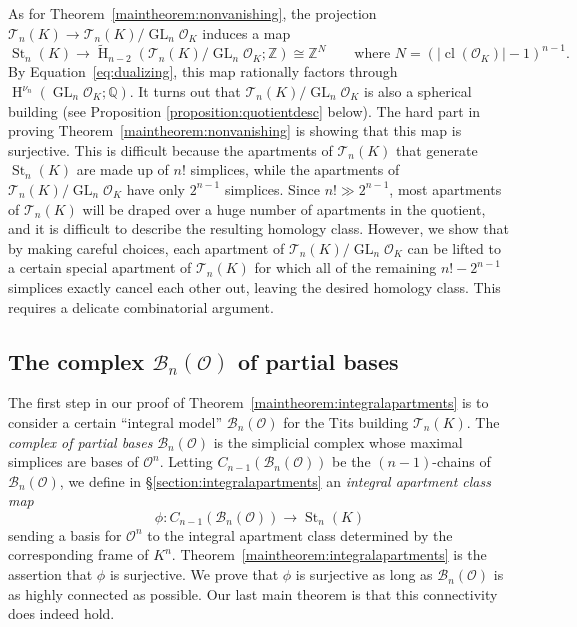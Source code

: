 \documentclass[11 pt]{article}
\theoremstyle{plain}
\theoremstyle{definition}
\numberwithin{equation}{section}
\DeclareMathOperator{\GL}{GL}
\newcommand\Z{\ensuremath{\mathbb{Z}}}
\newcommand\Q{\ensuremath{\mathbb{Q}}}
\DeclareMathOperator{\HH}{H}
\newcommand{\para}[1]{\bigskip\noindent\textbf{#1.}}
\renewcommand{\O}{\mathcal{O}}
\newcommand\PartialBases{\ensuremath{\mathcal{B}}}
\newcommand{\PB}{\PartialBases}
\DeclareMathOperator{\class}{cl}
\newcommand\Tits{\ensuremath{\mathcal{T}}}
\DeclareMathOperator{\St}{St}
\newcommand\abs[1]{\left\lvert#1\right\rvert}
\newcommand\iso{\cong}
\newcommand\GLvcd{\nu_n}
\begin{document}
As for Theorem~\ref{maintheorem:nonvanishing}, the projection $\Tits_n(K) \rightarrow \Tits_n(K)/\GL_n \O_K$
induces a map \[\St_n(K) \rightarrow \widetilde{\HH}_{n-2}(\Tits_n(K)/\GL_n\O_K;\Z) \iso \Z^N\qquad\text{where } N=(\abs{\class(\O_K)} - 1)^{n-1}.\] 
By Equation~\eqref{eq:dualizing}, this map rationally factors through $\HH^{\GLvcd}(\GL_n\O_K;\Q)$.
It turns out that $\Tits_n(K)/\GL_n\O_K$ is also a spherical building (see Proposition
\ref{proposition:quotientdesc} below).
The hard part in proving Theorem~\ref{maintheorem:nonvanishing} is showing that this map is surjective.  This is difficult because the apartments of $\Tits_n(K)$ that generate $\St_n(K)$ are made up of $n!$ simplices, while the apartments of $\Tits_n(K)/\GL_n \O_K$ have only $2^{n-1}$ simplices.  Since $n!\gg 2^{n-1}$, most apartments of $\Tits_n(K)$ will be draped over a huge number of apartments in the quotient, and it is difficult to describe the resulting homology class. However, we show that by making careful choices, each apartment of $\Tits_n(K)/\GL_n \O_K$ can be lifted to a certain special apartment of $\Tits_n(K)$ for which
all of the remaining $n!-2^{n-1}$ simplices exactly cancel each other out, leaving the desired homology class.  This requires a delicate combinatorial argument.

\subsection{The complex \texorpdfstring{$\PartialBases_n(\O)$}{PBnO} of partial bases} 

The first step in our proof of Theorem~\ref{maintheorem:integralapartments} is to consider a certain ``integral model'' $\PB_n(\O)$ for the Tits building $\Tits_n(K)$. The \emph{complex of partial bases} $\PB_n(\O)$ is the simplicial complex whose maximal simplices are bases of $\O^n$.
Letting $C_{n-1}(\PartialBases_n(\O))$ be the $(n-1)$-chains of $\PartialBases_n(\O)$, we define in \S\ref{section:integralapartments}  an  \emph{integral apartment class map}
\[\phi\colon C_{n-1}(\PartialBases_n(\O))\to \St_n(K)\] 
sending a basis for $\O^n$ to the integral apartment class determined by the corresponding frame of $K^n$.  Theorem~\ref{maintheorem:integralapartments} is the assertion that $\phi$ is surjective.  We prove that $\phi$ is surjective as long as $\PB_n(\O)$ is as highly connected as possible.  Our last main theorem is that this connectivity does indeed hold. %
\end{document}
